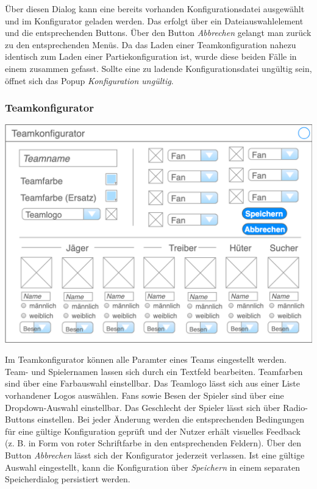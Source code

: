 \documentclass[a4paper,12pt,
headsepline,           %
oneside,               %
pointlessnumbers,      %
bibtotoc,              %
]{scrartcl}
\begin{document}
	Über diesen Dialog kann eine bereits vorhanden Konfigurationsdatei ausgewählt und im Konfigurator geladen werden. Das erfolgt über ein Dateiauswahlelement und die entsprechenden Buttons. Über den Button \textit{Abbrechen} gelangt man zurück zu den entsprechenden Menüs. Da das Laden einer Teamkonfiguration nahezu identisch zum Laden einer Partiekonfiguration ist, wurde diese beiden Fälle in einem zusammen gefasst. Sollte eine zu ladende Konfigurationsdatei ungültig sein, öffnet sich das Popup \textit{Konfiguration ungültig}.


	\subsubsection{Teamkonfigurator}
	
	\includegraphics[scale=0.4]{images/teamkonfigurator}
	
	Im Teamkonfigurator können alle Paramter eines Teams eingestellt werden. Team- und Spielernamen lassen sich durch ein Textfeld bearbeiten. Teamfarben sind über eine Farbauswahl einstellbar. Das Teamlogo lässt sich aus einer Liste vorhandener Logos auswählen. Fans sowie Besen der Spieler sind über eine Dropdown-Auswahl einstellbar. Das Geschlecht der Spieler lässt sich über Radio-Buttons einstellen. Bei jeder Änderung werden die entsprechenden Bedingungen für eine gültige Konfiguration geprüft und der Nutzer erhält visuelles Feedback (z. B. in Form von roter Schriftfarbe in den entsprechenden Feldern). Über den Button \textit{Abbrechen} lässt sich der Konfigurator jederzeit verlassen. Ist eine gültige Auswahl eingestellt, kann die Konfiguration über \textit{Speichern} in einem separaten Speicherdialog persistiert werden.
	
\end{document}
